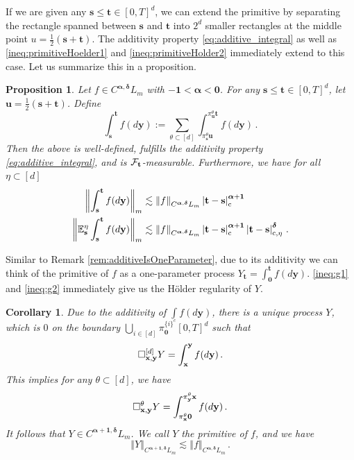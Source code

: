 \documentclass[12pt]{article}
\numberwithin{equation}{section}
\theoremstyle{plain}
\newtheorem{corollary}[theorem]{Corollary}
\newtheorem{proposition}[theorem]{Proposition}
\theoremstyle{definition}
\newcommand{\abs}[1]{\left\vert #1 \right\vert}
\newcommand{\norm}[1]{\left\Vert #1\right\Vert}
\def\bE{\mathbb{E}}\def\bW{\mathbb{W}}
\def\fs{\mathbf s}\def\ft{\mathbf t}
\def\fu{\mathbf u}\def\fv{\mathbf v}
\def\fy{\mathbf y}\def\fz{\mathbf z}
\def\falpha{{\boldsymbol\alpha}}
\def\fdelta{{\boldsymbol\delta}}
\def\foo{{\boldsymbol 0}}
\def\fone{{\boldsymbol 1}}
\begin{document}
If we are given any $\fs\le\ft\in[0,T]^d$, we can extend the primitive by separating the rectangle spanned between $\fs$ and $\ft$ into $2^d$ smaller rectangles at the middle point $u=\frac 12(\fs+\ft)$. The additivity property \eqref{eq:additive_integral} as well as \eqref{ineq:primitiveHoelder1} and \eqref{ineq:primitiveHolder2} immediately extend to this case. Let us summarize this in a proposition.

\begin{proposition}
    Let $f\in C^{\falpha,\fdelta}L_m$ with $-\fone<\falpha<\foo$. For any $\fs\le\ft\in[0,T]^d$, let $\fu = \frac 12(\fs+\ft)$. Define
    \begin{equation*}
        \int_\fs^\ft f(d\fy) := \sum_{\theta\subset[d]} \int_{\pi^\theta_\fs \fu}^{\pi^\theta_\fu\ft} f(d\fy)\,.
    \end{equation*}
    Then the above is well-defined, fulfills the additivity property \eqref{eq:additive_integral}, and is $\cF_\ft$-measurable. Furthermore, we have for all $\eta\subset[d]$
    \begin{align}
    \norm{\int_\fs^\ft f(d\fy)}_m &\lesssim \norm{f}_{C^{\falpha,\fdelta}L_m}\abs{\ft-\fs}_{\text c}^{\falpha+\fone} \label{ineq:g1}\\
    \norm{\bE^\eta_\fs\int_\fs^\ft f(d\fy)}_m &\lesssim \norm{f}_{C^{\falpha,\fdelta}L_m}\abs{\ft-\fs}_{\text c}^{\falpha+\fone}\abs{\ft-\fs}_{\text c,\eta}^{\fdelta}\,.\label{ineq:g2}
\end{align}
\end{proposition}

Similar to Remark \ref{rem:additiveIsOneParameter}, due to its additivity we can think of the primitive of $f$ as a one-parameter process $Y_\ft = \int_\foo^\ft f(d\fy)$. \eqref{ineq:g1} and \eqref{ineq:g2} immediately give us the Hölder regularity of $Y$.

\begin{corollary}\label{cor:IntegrationInCalpha}
    Due to the additivity of $\int f(d\fy)$, there is a unique process $Y$, which is $0$ on the boundary $\bigcup_{i\in[d]} \pi^{\{i\}^c}_\foo [0,T]^d$ such that
    \[
        \square^{[d]}_{\fx,\fy} Y = \int_\fx^\fy f(d\fy)\,.
    \]
    This implies for any $\theta\subset[d]$, we have
    \[
        \square^\theta_{\fx,\fy} Y = \int_{\pi_\fx^\theta \foo}^{\pi^\theta_\fy \fx} f(d\fy)\,.
    \]
    It follows that $Y\in C^{\falpha+\fone,\fdelta}L_m$. We call $Y$ the primitive of $f$, and we have
    \[
\norm{Y}_{C^{\falpha+\fone,\fdelta}L_m} \lesssim \norm{f}_{C^{\falpha,\fdelta}L_m}\,.
    \]
\end{corollary}
\end{document}
